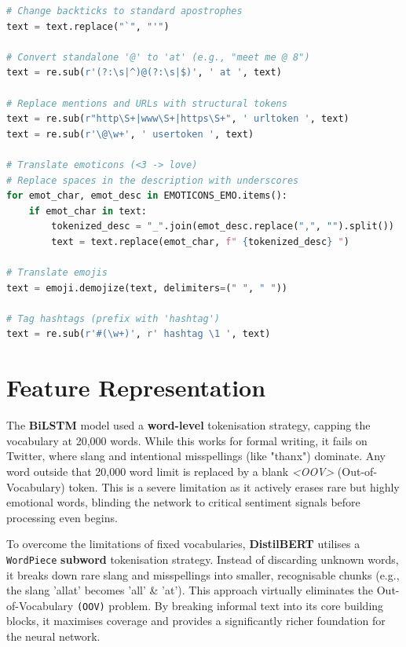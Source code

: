 \documentclass[12pt, a4paper]{article}
\begin{document}
\newpage

\noindent\begin{minipage}{\textwidth}
\begin{lstlisting}[language=Python, caption=Implementation of noise reduction and explicit emotional tokenisation.]
# Change backticks to standard apostrophes
text = text.replace("`", "'")

# Convert standalone '@' to 'at' (e.g., "meet me @ 8")
text = re.sub(r'(?:\s|^)@(?:\s|$)', ' at ', text)

# Replace mentions and URLs with structural tokens
text = re.sub(r"http\S+|www\S+|https\S+", ' urltoken ', text)
text = re.sub(r'\@\w+', ' usertoken ', text)

# Translate emoticons (<3 -> love)
# Replace spaces in the description with underscores
for emot_char, emot_desc in EMOTICONS_EMO.items():
    if emot_char in text:
        tokenized_desc = "_".join(emot_desc.replace(",", "").split())
        text = text.replace(emot_char, f" {tokenized_desc} ")

# Translate emojis
text = emoji.demojize(text, delimiters=(" ", " "))

# Tag hashtags (prefix with 'hashtag')
text = re.sub(r'#(\w+)', r' hashtag \1 ', text)
\end{lstlisting}
\end{minipage}

\vspace{0.5cm}

\section{Feature Representation}

\quad The \textbf{BiLSTM} model used a \textbf{word-level} tokenisation strategy, capping the vocabulary at 20,000 words. While this works for formal writing, it fails on Twitter, where slang and intentional misspellings (like "thanx") dominate. Any word outside that 20,000 word limit is replaced by a blank \textit{<OOV>} (Out-of-Vocabulary) token. This is a severe limitation as it actively erases rare but highly emotional words, blinding the network to critical sentiment signals before processing even begins.

\vspace{0.5cm}

To overcome the limitations of fixed vocabularies, \textbf{DistilBERT} utilises a \texttt{WordPiece} \textbf{subword} tokenisation strategy. Instead of discarding unknown words, it breaks down rare slang and misspellings into smaller, recognisable chunks (e.g., the slang 'allat' becomes 'all' \& 'at'). This approach virtually eliminates the Out-of-Vocabulary \texttt{(OOV)} problem. By breaking informal text into its core building blocks, it maximises coverage and provides a significantly richer foundation for the neural network.
\end{document}
